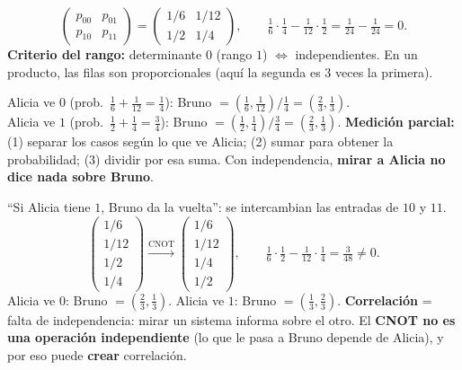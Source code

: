 \documentclass[11pt, a4paper, twoside, openright]{report}
\begin{document}
{\[ \begin{pmatrix}p_{00}&p_{01}\\p_{10}&p_{11}\end{pmatrix} = \begin{pmatrix}1/6&1/12\\1/2&1/4\end{pmatrix}, \qquad \tfrac16\cdot\tfrac14 - \tfrac1{12}\cdot\tfrac12 = \tfrac1{24} - \tfrac1{24} = 0. \]}
{\textbf{Criterio del rango:} determinante $0$ (rango $1$) $\iff$ independientes. En un producto, las filas son proporcionales (aquí la segunda es $3$ veces la primera).}

{Alicia ve $0$ (prob.\ $\frac16 + \frac1{12} = \frac14$): Bruno $= \left(\frac16, \frac1{12}\right)\big/\frac14 = \left(\frac23, \frac13\right)$. \\
Alicia ve $1$ (prob.\ $\frac12 + \frac14 = \frac34$): Bruno $= \left(\frac12, \frac14\right)\big/\frac34 = \left(\frac23, \frac13\right)$.}
{\textbf{Medición parcial:} (1) separar los casos según lo que ve Alicia; (2) sumar para obtener la probabilidad; (3) dividir por esa suma. Con independencia, \textbf{mirar a Alicia no dice nada sobre Bruno}.}

{``Si Alicia tiene $1$, Bruno da la vuelta'': se intercambian las entradas de $10$ y $11$.
\[ \begin{pmatrix}1/6\\1/12\\1/2\\1/4\end{pmatrix} \xrightarrow{\text{CNOT}} \begin{pmatrix}1/6\\1/12\\1/4\\1/2\end{pmatrix}, \qquad \tfrac16\cdot\tfrac12 - \tfrac1{12}\cdot\tfrac14 = \tfrac{3}{48} \neq 0. \]
Alicia ve $0$: Bruno $= \left(\frac23,\frac13\right)$. \quad Alicia ve $1$: Bruno $= \left(\frac13,\frac23\right)$.}
{\textbf{Correlación} = falta de independencia: mirar un sistema informa sobre el otro. El \textbf{CNOT no es una operación independiente} (lo que le pasa a Bruno depende de Alicia), y por eso puede \textbf{crear} correlación.}
\end{document}
